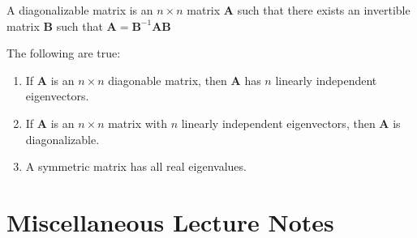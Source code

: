 \documentclass[crop=false,class=book,oneside]{standalone}
\begin{document}
        \begin{definition}
            A diagonalizable matrix is an
            ${n}\times{n}$ matrix
            $\mathbf{A}$ such that there exists
            an invertible matrix $\mathbf{B}$
            such that
            $\mathbf{A}=\mathbf{B}^{-1}\mathbf{A}\mathbf{B}$
        \end{definition}
        \begin{theorem*}
            The following are true:
            \begin{enumerate}
                \item If $\mathbf{A}$ is an ${n}\times{n}$
                    diagonable matrix, then $\mathbf{A}$
                    has $n$ linearly independent
                    eigenvectors.
                \item If $\mathbf{A}$ is an ${n}\times{n}$
                    matrix with $n$ linearly independent
                    eigenvectors, then $\mathbf{A}$
                    is diagonalizable.
                \item A symmetric matrix has all real
                    eigenvalues.
            \end{enumerate}
        \end{theorem*}
    \section{Miscellaneous Lecture Notes}
\end{document}
